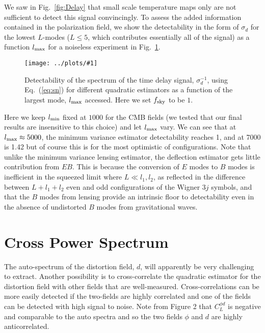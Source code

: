 \documentclass[prd,amsmath,amssymb,floatfix,superscriptaddress,nofootinbib,twocolumn]{revtex4-1}
\newcommand{\ec}[1]{Eq.~(\ref{eq:#1})}
\newcommand{\sfig}[2]{
\texttt{[image: ../plots/\#1]}
        }
\newcommand{\Sfig}[2]{
   \begin{figure}[thbp]
   \begin{center}
    \sfig{#1.pdf}{\columnwidth}
    \caption{{\small #2}}
    \label{fig:#1}
     \end{center}
   \end{figure}
}
\newcommand{\rf}[1]{\ref{fig:#1}}
\begin{document}
We saw in Fig.~\rf{Delay} that small scale temperature maps only are not sufficient to detect this signal convincingly. To assess the added information contained in the polarization field, we show the detectability in the form of $\sigma_d$ for the lowest $L$-modes ($L\leqslant 5$, which contributes essentially all of the signal) as a function $l_{\rm max}$ for a noiseless experiment in Fig.~\rf{StoN}.


\Sfig{StoN}{Detectability of the spectrum of the time delay signal, $\sigma_d^{-1}$, using \ec{sn} for different quadratic estimators as a function of the largest mode, $l_{\rm max}$ accessed. Here we set $f_{\rm sky}$ to be $1$.}

Here we keep $l_{\rm min}$ fixed at $1000$ for the CMB fields (we tested that our final results are insensitive to this choice) and let $l_{\rm max}$ vary.
We can see that at $l_{\rm max} \approx 5000$, the minimum variance estimator detectability reaches 1, and at 7000 is 1.42 but of course this is for the most optimistic of configurations. 
Note that unlike the minimum variance lensing  estimator, the deflection estimator
gets little contribution from $EB$.   This is because the conversion of $E$ modes to $B$
modes is inefficient in the squeezed limit where $L\ll l_1,l_2$, as reflected in the difference between
$L+l_1+l_2$ even and odd configurations of the Wigner 3$j$ symbols, and that the $B$ modes from lensing
provide an intrinsic floor to detectability even in the absence of undistorted $B$ modes
from gravitational waves.



\section{Cross Power Spectrum}
\label{sec:cross}

The auto-spectrum of the distortion field, $d$, will apparently be very challenging to extract. Another possibility is to cross-correlate the quadratic estimator for the distortion field with other fields that are well-measured. Cross-correlations can be more easily detected if the two-fields are highly correlated and one of the fields can be detected with high signal to noise. Note from Figure 2 that $C^{\phi d}_{L}$ is negative and comparable to the auto spectra and so the two fields $\phi$ and $d$  are highly anticorrelated.
\end{document}
